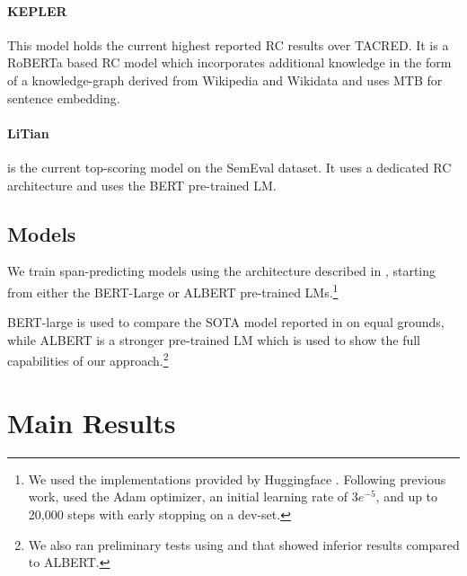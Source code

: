 \documentclass[11pt]{article}
\begin{document}
\paragraph{KEPLER} \cite{Wang2019} 
This model holds the current highest reported RC results over TACRED.
It is a RoBERTa based RC model which incorporates additional knowledge in the form of a knowledge-graph derived from Wikipedia and Wikidata and uses MTB for sentence embedding. 

\paragraph{LiTian} \cite{Li2020} is the current top-scoring model on the SemEval dataset. It uses a dedicated RC architecture and uses the BERT pre-trained LM. 

\subsection{Models}
We train span-predicting models using the architecture described in \cite{Devlin2018}, starting from either the BERT-Large \cite{Devlin2018} or ALBERT \cite{Lan2019} pre-trained LMs.\footnote{We used the implementations provided by Huggingface \cite{Wolf2019}. Following previous work, used the Adam optimizer, an initial learning rate of $3e^{-5}$, and up to 20,000 steps with early stopping on a dev-set.}

BERT-large is used to compare the SOTA model reported in \cite{Soares2019} on equal grounds, while ALBERT is a stronger pre-trained LM which is used to show the full capabilities of our approach.\footnote{We also ran preliminary tests using \cite{Liu2019} and \cite{Joshi2019} that showed inferior results compared to ALBERT.}


\section{Main Results}
\end{document}
